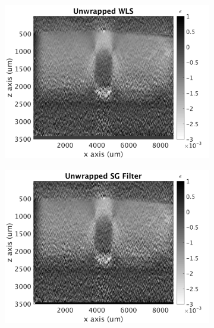 \begin{figure}[b!]
	\centering
    \begin{subfigure}{0.49\textwidth}
    	\centering
        \includegraphics[width=\textwidth]{figures/wls_fr70_lr0.png}
	\end{subfigure}
    \begin{subfigure}{0.49\textwidth}
    	\centering
        \includegraphics[width=\textwidth]{figures/uwsg_fr70_lr0.png}
	\end{subfigure}
    \\
    \begin{subfigure}{0.49\textwidth}
    	\centering

\end{subfigure}
\end{figure}
